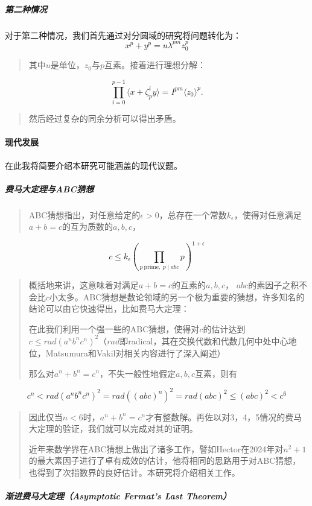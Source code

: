 \documentclass{article}
\newcommand{\upcite}[1]{\textsuperscript{\textsuperscript{\cite{#1}}}}
\begin{document}
\subparagraph{第二种情况} 对于第二种情况，我们首先通过对分圆域的研究将问题转化为：
$$
x^p + y^p = u \lambda^{pm} z_0^{p}
$$
\begin{quote}
其中$u$是单位，$z_0$与$p$互素。接着进行理想分解：
\end{quote}
$$
\prod_{i=0}^{p-1}\langle x+\zeta_p^iy\rangle = I^{pm} \langle z_0\rangle^p.
$$
\begin{quote}
然后经过复杂的同余分析可以得出矛盾。
\end{quote}

\paragraph{现代发展} 在此我将简要介绍本研究可能涵盖的现代议题。

\subparagraph{费马大定理与ABC猜想} 
\begin{quote}
ABC猜想指出\upcite{ref11}，对任意给定的$\epsilon > 0$，总存在一个常数$k_\epsilon$，使得对任意满足$a+b=c$的互为质数的$a,b,c$，
\end{quote}
$$
c \leq k_\epsilon \left(\prod_{p \ \text{prime}, \ p \mid abc} p\right)^{1+\epsilon}
$$

\begin{quote}
概括地来讲，这意味着对满足$a+b=c$的互素的$a, b, c$， $abc$的素因子之积不会比$c$小太多。ABC猜想是数论领域的另一个极为重要的猜想，许多知名的结论可以由它快速得出，比如费马大定理\upcite{ref11}：

在此我们利用一个强一些的ABC猜想，使得对$c$的估计达到$c \leq rad(a^n b^n c^n)^2$（$rad$即radical，其在交换代数和代数几何中处中心地位，Matsumura\upcite{ref5}和Vakil\upcite{ref7}对相关内容进行了深入阐述）

那么对$a^n + b^n = c^n$，不失一般性地假定$a, b, c$互素，则有
\end{quote}
$$
c^n < rad(a^n b^n c^n)^2 = rad((abc)^n)^2 = rad(abc)^2 \leq (abc)^2 < c^6
$$
\begin{quote}
因此仅当$n < 6$时，$a^n + b^n = c^n$才有整数解。再佐以对3，4，5情况的费马大定理的验证，我们就可以完成对其的证明。

近年来数学界在ABC猜想上做出了诸多工作，譬如Hector在2024年对$n^2 + 1$的最大素因子进行了卓有成效的估计，他将相同的思路用于对ABC猜想，也得到了次指数界的良好估计\upcite{ref8}。本研究将介绍相关工作。
\end{quote}

\subparagraph{渐进费马大定理（Asymptotic Fermat's Last Theorem）}
\end{document}
